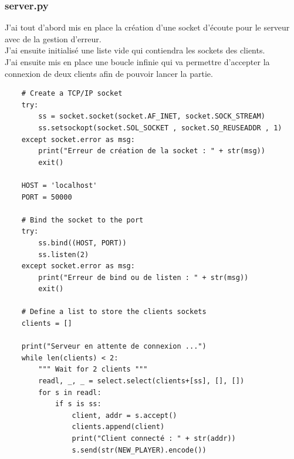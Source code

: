 \documentclass{article}
\begin{document}
\subsubsection{server.py}
J'ai tout d'abord mis en place la création d'une socket d'écoute pour le serveur avec de la gestion d'erreur.\\
J'ai ensuite initialisé une liste vide qui contiendra les sockets des clients.\\
J'ai ensuite mis en place une boucle infinie qui va permettre d'accepter la connexion de deux clients afin de pouvoir lancer la partie.\\
\begin{lstlisting}
    # Create a TCP/IP socket
    try:
        ss = socket.socket(socket.AF_INET, socket.SOCK_STREAM)
        ss.setsockopt(socket.SOL_SOCKET , socket.SO_REUSEADDR , 1)
    except socket.error as msg:
        print("Erreur de création de la socket : " + str(msg))
        exit()
    
    HOST = 'localhost'
    PORT = 50000
    
    # Bind the socket to the port
    try:
        ss.bind((HOST, PORT))
        ss.listen(2)
    except socket.error as msg:
        print("Erreur de bind ou de listen : " + str(msg))
        exit()
    
    # Define a list to store the clients sockets
    clients = []
    
    print("Serveur en attente de connexion ...")
    while len(clients) < 2:
        """ Wait for 2 clients """
        readl, _, _ = select.select(clients+[ss], [], [])
        for s in readl:
            if s is ss:
                client, addr = s.accept()
                clients.append(client)
                print("Client connecté : " + str(addr))
                s.send(str(NEW_PLAYER).encode())
\end{lstlisting}
\end{document}
